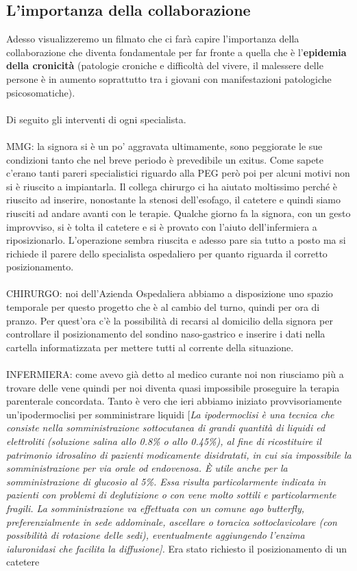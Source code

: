 \subsection{L'importanza della collaborazione}

Adesso visualizzeremo un filmato che ci farà capire l'importanza della
collaborazione che diventa fondamentale per far fronte a quella che è
l'\textbf{epidemia della cronicità} (patologie croniche e difficoltà del
vivere, il malessere delle persone è in aumento soprattutto tra i
giovani con manifestazioni patologiche psicosomatiche).
\\\\
Di seguito gli interventi di ogni specialista.
\\\\
MMG: la signora si è un po' aggravata ultimamente, sono peggiorate le
sue condizioni tanto che nel breve periodo è prevedibile un exitus. Come
sapete c'erano tanti pareri specialistici riguardo alla PEG però poi per
alcuni motivi non si è riuscito a impiantarla. Il collega chirurgo ci ha
aiutato moltissimo perché è riuscito ad inserire, nonostante la stenosi
dell'esofago, il catetere e quindi siamo riusciti ad andare avanti con
le terapie. Qualche giorno fa la signora, con un gesto improvviso, si è
tolta il catetere e si è provato con l'aiuto dell'infermiera a
riposizionarlo. L'operazione sembra riuscita e adesso pare sia tutto a
posto ma si richiede il parere dello specialista ospedaliero per quanto
riguarda il corretto posizionamento.
\\\\
CHIRURGO: noi dell'Azienda Ospedaliera abbiamo a disposizione uno spazio
temporale per questo progetto che è al cambio del turno, quindi per ora
di pranzo. Per quest'ora c'è la possibilità di recarsi al domicilio
della signora per controllare il posizionamento del sondino
naso-gastrico e inserire i dati nella cartella informatizzata per
mettere tutti al corrente della situazione.
\\\\
INFERMIERA: come avevo già detto al medico curante noi non riusciamo più
a trovare delle vene quindi per noi diventa quasi impossibile proseguire
la terapia parenterale concordata. Tanto è vero che ieri abbiamo
iniziato provvisoriamente un'ipodermoclisi per somministrare liquidi
{[}\emph{La ipodermoclisi è una tecnica che consiste nella
somministrazione sottocutanea di grandi quantità di liquidi ed
elettroliti (soluzione salina allo 0.8\% o allo 0.45\%), al fine di
ricostituire il patrimonio idrosalino di pazienti modicamente
disidratati, in cui sia impossibile la somministrazione per via orale od
endovenosa. È utile anche per la somministrazione di glucosio al 5\%.
Essa risulta particolarmente indicata in pazienti con problemi di
deglutizione o con vene molto sottili e particolarmente fragili. La
somministrazione va effettuata con un comune ago butterfly,
preferenzialmente in sede addominale, ascellare o toracica
sottoclavicolare (con possibilità di rotazione delle sedi),
eventualmente aggiungendo l'enzima ialuronidasi che facilita la
diffusione{]}.} Era stato richiesto il posizionamento di un catetere
